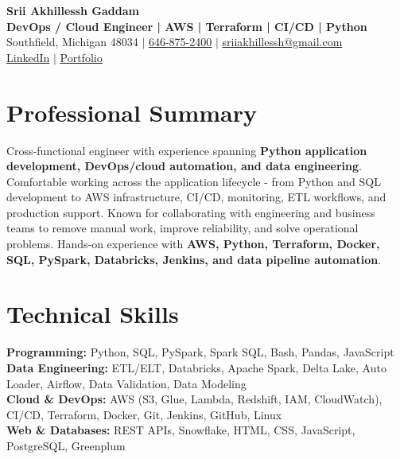 \documentclass[letterpaper,10pt]{article}
\begin{document}
\fontsize{9.35pt}{10.45pt}\selectfont

\begin{center}
    {\LARGE \textbf{Srii Akhillessh Gaddam}} \\[-1pt]
    \textbf{DevOps / Cloud Engineer | AWS | Terraform | CI/CD | Python} \\[2pt]
    Southfield, Michigan 48034 $|$
    \href{tel:6468752400}{646-875-2400} $|$
    \href{mailto:sriiakhillessh@gmail.com}{sriiakhillessh@gmail.com} \\[1pt]
    \href{https://www.linkedin.com/in/srii-akhiilessh-gaddam-b48668191/}{LinkedIn} $|$
    \href{https://sriiakhillesshg.github.io/portfolio/}{Portfolio}
\end{center}
\vspace{-8pt}

\section{Professional Summary}
\small{Cross-functional engineer with experience spanning \textbf{Python application development, DevOps/cloud automation, and data engineering}. Comfortable working across the application lifecycle - from Python and SQL development to AWS infrastructure, CI/CD, monitoring, ETL workflows, and production support. Known for collaborating with engineering and business teams to remove manual work, improve reliability, and solve operational problems. Hands-on experience with \textbf{AWS, Python, Terraform, Docker, SQL, PySpark, Databricks, Jenkins, and data pipeline automation}.}

\section{Technical Skills}
\small{
\textbf{Programming:} Python, SQL, PySpark, Spark SQL, Bash, Pandas, JavaScript \\
\textbf{Data Engineering:} ETL/ELT, Databricks, Apache Spark, Delta Lake, Auto Loader, Airflow, Data Validation, Data Modeling \\
\textbf{Cloud \& DevOps:} AWS (S3, Glue, Lambda, Redshift, IAM, CloudWatch), CI/CD, Terraform, Docker, Git, Jenkins, GitHub, Linux \\
\textbf{Web \& Databases:} REST APIs, Snowflake, HTML, CSS, JavaScript, PostgreSQL, Greenplum
}
\end{document}
